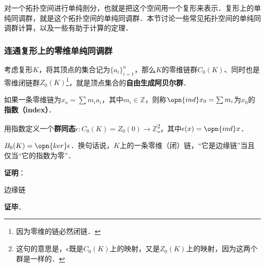 

对一个拓扑空间进行单纯剖分，也就是把这个空间用一个复形来表示．复形上的单纯同调群，就是这个拓扑空间的单纯同调群．本节讨论一些常见拓扑空间的单纯同调群计算，以及一些有助于计算的定理．

\subsubsection{连通复形上的零维单纯同调群}

考虑复形$K$，将其顶点的集合记为$\{a_i\}_{i=1}^n$，那么$K$的零维链群$C_0(K)$、同时也是零维闭链群$Z_0(K)$\footnote{因为零维的链必然闭链．}，就是顶点集合的\textbf{自由生成阿贝尔群}．

如果一条零维链为$x_o=\sum m_ia_i$，其中$m_i\in\mathbb{Z}$，则称$\opn{ind} x_0=\sum m_i$为$x_0$的\textbf{指数（index）}．

用指数定义一个\textbf{群同态}$\epsilon: C_0(K)=Z_0(0)\to\mathbb{Z}$\footnote{这句的意思是，$\epsilon$既是$C_0(K)$上的映射，又是$Z_0(K)$上的映射，因为这两个群是一样的．}，其中$\epsilon(x)=\opn{ind} x$．

\begin{lemma}{}
$B_0(K)=\opn{ker}\epsilon$．换句话说，$K$上的一条零维（闭）链，“它是边缘链”当且仅当“它的指数为零”．
\end{lemma}

\textbf{证明}：

边缘链

\textbf{证毕}．













